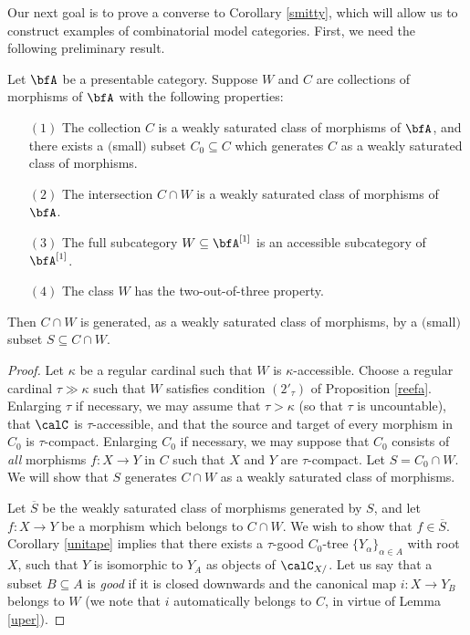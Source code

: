 \begin{Model Categories}
Our next goal is to prove a converse to Corollary \ref{smitty}, which will allow us to construct examples of combinatorial model categories. First, we need the following preliminary result.

\begin{lemma}\label{seeva}
Let $\bfA$ be a presentable category. Suppose $W$ and $C$ are collections of morphisms
of $\bfA$ with the following properties:
\begin{itemize}
\item[$(1)$] The collection $C$ is a weakly saturated class of morphisms of $\bfA$, and there exists a $($small$)$ subset $C_0 \subseteq C$ which generates $C$ as a weakly saturated class of morphisms.
\item[$(2)$] The intersection $C \cap W$ is a weakly saturated class of morphisms of $\bfA$.
\item[$(3)$] The full subcategory $W \subseteq \bfA^{[1]}$ is an accessible subcategory
of $\bfA^{[1]}$.
\item[$(4)$] The class $W$ has the two-out-of-three property.
\end{itemize}
Then $C \cap W$ is generated, as a weakly saturated class of morphisms, by a $($small$)$ subset
$S \subseteq C \cap W$.
\end{lemma}

\begin{proof}
Let $\kappa$ be a regular cardinal such that $W$ is $\kappa$-accessible. Choose a regular cardinal $\tau \gg \kappa$ such that $W$ satisfies condition $(2'_{\tau})$ of Proposition \ref{reefa}. Enlarging $\tau$ if necessary, we may assume that $\tau > \kappa$ (so that $\tau$ is uncountable), that $\calC$ is $\tau$-accessible, and that the source and target of every morphism in $C_0$ is 
$\tau$-compact. Enlarging $C_0$ if necessary, we may suppose that $C_0$ consists of {\em all} morphisms $f: X \rightarrow Y$ in $C$ such that $X$ and $Y$ are $\tau$-compact. Let $S = C_0 \cap W$. We will show that $S$ generates $C \cap W$ as a weakly saturated class of morphisms.

Let $\overline{S}$ be the weakly saturated class of morphisms generated by $S$, and let
$f: X \rightarrow Y$ be a morphism which belongs to $C \cap W$. We wish to show that $f \in \overline{S}$. Corollary \ref{unitape} implies that there exists a $\tau$-good $C_0$-tree $\{ Y_{\alpha} \}_{\alpha \in A}$ with root $X$, such that
$Y$ is isomorphic to $Y_{A}$ as objects of $\calC_{X/}$. Let us say that a subset $B \subseteq A$ is {\it good} if it is closed downwards and the canonical map $i: X \rightarrow Y_{B}$ belongs to $W$ (we note that $i$ automatically belongs to $C$, in virtue of Lemma \ref{uper}). 


\end{proof}
\end{Model Categories}
